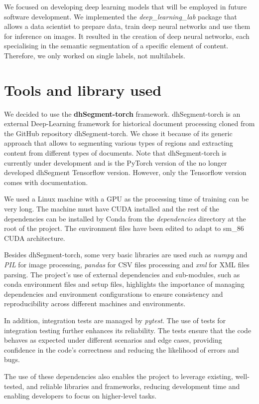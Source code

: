 \documentclass{polytech/polytech}
\numberwithin{figure}{chapter}
\begin{document}
We focused on developing deep learning models that will be employed in future software development.
We implemented the {\it deep_learning_lab} package that allows a data scientist to prepare data, train deep neural networks and use them for inference on images.
It resulted in the creation of deep neural networks, each specialising in the semantic segmentation of a specific element of content.
Therefore, we only worked on single labels, not multilabels.

\section{Tools and library used}

We decided to use the {\bf dhSegment-torch} framework.
dhSegment-torch is an external Deep-Learning framework for historical document processing cloned from the GitHub repository dhSegment-torch.
We chose it because of its generic approach that allows to segmenting various types of regions and extracting content from different types of documents.
Note that dhSegment-torch is currently under development and is the PyTorch version of the no longer developed dhSegment Tensorflow version.
However, only the Tensorflow version comes with documentation.

We used a Linux machine with a GPU as the processing time of training can be very long.
The machine must have CUDA installed and the rest of the dependencies can be installed by Conda from the {\it dependencies} directory at the root of the project.
The environment files have been edited to adapt to sm_86 CUDA architecture.

Besides dhSegment-torch, some very basic libraries are used such as {\it numpy} and {\it PIL} for image processing, {\it pandas} for CSV files processing and {\it xml} for XML files parsing.
The project's use of external dependencies and sub-modules, such as conda environment files and setup files, highlights the importance of managing dependencies and environment configurations to ensure consistency and reproducibility across different machines and environments.

In addition, integration tests are managed by {\it pytest}.
The use of tests for integration testing further enhances its reliability.
The tests ensure that the code behaves as expected under different scenarios and edge cases, providing confidence in the code's correctness and reducing the likelihood of errors and bugs.

The use of these dependencies also enables the project to leverage existing, well-tested, and reliable libraries and frameworks, reducing development time and enabling developers to focus on higher-level tasks.
\end{document}
